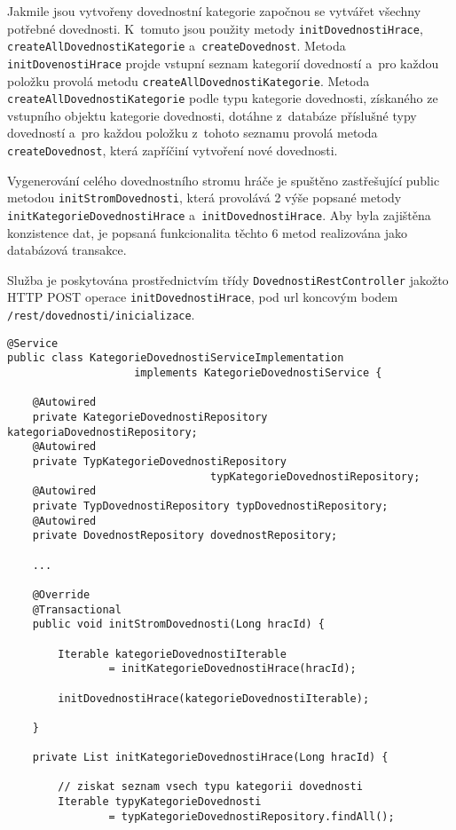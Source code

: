 \documentclass[twoside, 12pt]{article}
\begin{document}
{Jakmile jsou vytvořeny dovednostní kategorie započnou se vytvářet všechny potřebné dovednosti.
K~tomuto jsou použity metody \texttt{initDovednostiHrace}, \texttt{createAllDovednostiKategorie} a~\texttt{createDovednost}.
Metoda \texttt{initDovenostiHrace} projde vstupní seznam kategorií dovedností
a~pro každou položku provolá metodu \texttt{createAllDovednostiKategorie}.
Metoda \texttt{createAllDovednostiKategorie}  podle typu kategorie dovednosti,
získaného ze vstupního objektu kategorie dovednosti,
dotáhne z~databáze příslušné typy dovedností a~pro každou položku z~tohoto seznamu provolá metoda \texttt{createDovednost},
která zapříčiní vytvoření nové dovednosti.

Vygenerování celého dovednostního stromu hráče je spuštěno zastřešující public metodou \texttt{initStromDovednosti},
která provolává 2 výše popsané metody \texttt{initKategorieDovednostiHrace} a~\texttt{initDovednostiHrace}.
Aby byla zajištěna konzistence dat, je popsaná funkcionalita těchto 6 metod realizována jako databázová transakce.

Služba je poskytována prostřednictvím třídy \texttt{DovednostiRestController} jakožto HTTP POST operace \texttt{initDovednostiHrace},
pod url koncovým bodem \texttt{/rest/dovednosti/inicializace}.

\begin{lstlisting}
@Service
public class KategorieDovednostiServiceImplementation
                    implements KategorieDovednostiService {

    @Autowired
    private KategorieDovednostiRepository kategoriaDovednostiRepository;
    @Autowired
    private TypKategorieDovednostiRepository
                                typKategorieDovednostiRepository;
    @Autowired
    private TypDovednostiRepository typDovednostiRepository;
    @Autowired
    private DovednostRepository dovednostRepository;

    ...

    @Override
    @Transactional
    public void initStromDovednosti(Long hracId) {

        Iterable kategorieDovednostiIterable
                = initKategorieDovednostiHrace(hracId);

        initDovednostiHrace(kategorieDovednostiIterable);

    }

    private List initKategorieDovednostiHrace(Long hracId) {

        // ziskat seznam vsech typu kategorii dovednosti
        Iterable typyKategorieDovednosti
                = typKategorieDovednostiRepository.findAll();


\end{lstlisting}}
\end{document}
